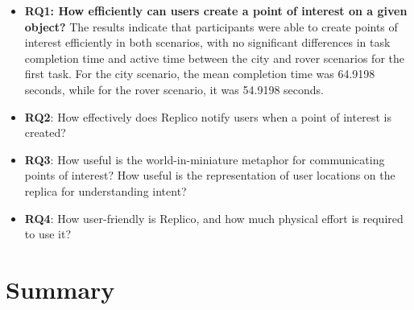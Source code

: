         \begin{itemize}
            \item \textbf{RQ1: How efficiently can users create a point of interest on a given object?} The results indicate that participants were able to create points of interest efficiently in both scenarios, with no significant differences in task completion time and active time between the city and rover scenarios for the first task. For the city scenario, the mean completion time was 64.9198 seconds, while for the rover scenario, it was 54.9198 seconds. 
            \item \textbf{RQ2}: How effectively does Replico notify users when a point of interest is created?
            \item \textbf{RQ3}: How useful is the world-in-miniature metaphor for communicating points of interest? How useful is the representation of user locations on the replica for understanding intent? 
            \item \textbf{RQ4}: How user-friendly is Replico, and how much physical effort is required to use it? 
        \end{itemize}

    \section{Summary}

